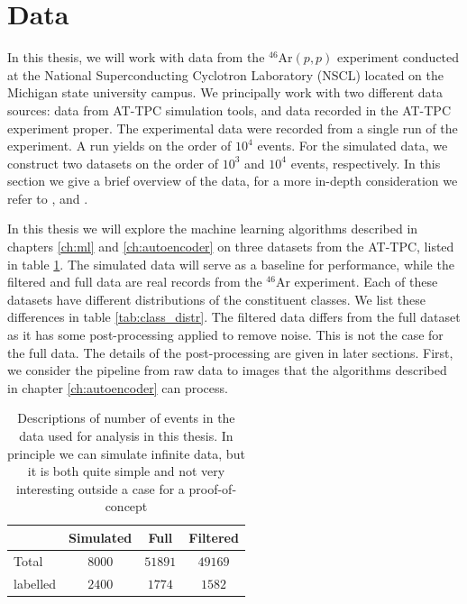 \section{Data}\label{sec:data}

In this thesis, we will work with data from the ${}^{46}$Ar$(p, p)$ experiment conducted at the National Superconducting Cyclotron Laboratory (NSCL) located on the Michigan state university campus. We principally work with two different data sources: data from AT-TPC simulation tools, and data recorded in the AT-TPC experiment proper. The experimental data were recorded from a single run of the experiment. A run yields on the order of $10^4$ events. For the simulated data, we construct two datasets on the order of $10^3$ and $10^4$ events, respectively. In this section we give a brief overview of the data, for a more in-depth consideration we refer to \cite{Mittig2015}, \cite{Suzuki2012} and  \cite{Bradt2017a}. 

In this thesis we will explore the machine learning algorithms described in chapters \ref{ch:ml} and \ref{ch:autoencoder} on three datasets from the AT-TPC, listed in table \ref{tab:datasets}. The simulated data will serve as a baseline for performance, while the filtered and full data are real records from the ${}^{46}$Ar experiment. Each of these datasets have different distributions of the constituent classes. We list these differences in table \ref{tab:class_distr}. The filtered data differs from the full dataset as it has some post-processing applied to remove noise. This is not the case for the full data. The details of the post-processing are given in later sections. First, we consider the pipeline from raw data to images that the algorithms described in chapter \ref{ch:autoencoder} can process. 

\begin{table}
\centering
\caption{Descriptions of number of events in the data used for analysis in this thesis. In principle we can simulate infinite data, but it is both quite simple and not very interesting outside a case for a proof-of-concept}\label{tab:datasets}
\begin{tabular}{lccc}
\toprule
{} & Simulated & Full & Filtered \\
\midrule
Total &  $8000$ & $51891$ & $49169$ \\
labelled & $2400$ & $1774$ &  $1582$ \\ 
\bottomrule
\end{tabular}
\end{table}

